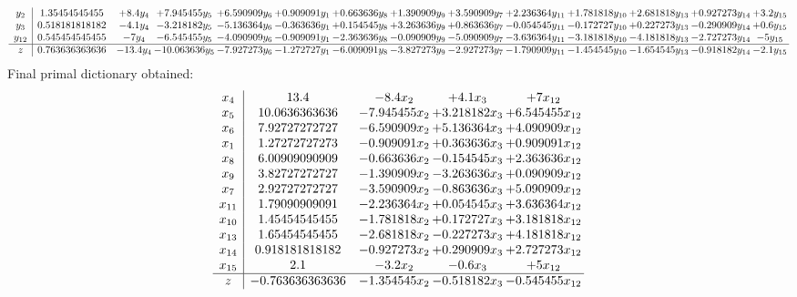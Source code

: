 \documentclass[11pt]{article}
\begin{document}
\[\begin{array}{c| c c@{\hskip 2pt} c@{\hskip 2pt} c@{\hskip 2pt} c@{\hskip 2pt} c@{\hskip 2pt} c@{\hskip 2pt} c@{\hskip 2pt} c@{\hskip 2pt} c@{\hskip 2pt} c@{\hskip 2pt} c@{\hskip 2pt} c@{\hskip 2pt} }
 y_{2}   &  1.35454545455 & + 8.4 y_{4} & + 7.945455 y_{5} & + 6.590909 y_{6} & + 0.909091 y_{1} & + 0.663636 y_{8} & + 1.390909 y_{9} & + 3.590909 y_{7} & + 2.236364 y_{11} & + 1.781818 y_{10} & + 2.681818 y_{13} & + 0.927273 y_{14} & + 3.2 y_{15}\\
 y_{3}   &  0.518181818182 & -4.1 y_{4} & -3.218182 y_{5} & -5.136364 y_{6} & -0.363636 y_{1} & + 0.154545 y_{8} & + 3.263636 y_{9} & + 0.863636 y_{7} & -0.054545 y_{11} & -0.172727 y_{10} & + 0.227273 y_{13} & -0.290909 y_{14} & + 0.6 y_{15}\\
 y_{12}   &  0.545454545455 & -7 y_{4} & -6.545455 y_{5} & -4.090909 y_{6} & -0.909091 y_{1} & -2.363636 y_{8} & -0.090909 y_{9} & -5.090909 y_{7} & -3.636364 y_{11} & -3.181818 y_{10} & -4.181818 y_{13} & -2.727273 y_{14} & -5 y_{15}\\
\hline
z    &  0.763636363636 & -13.4 y_{4} & -10.063636 y_{5} & -7.927273 y_{6} & -1.272727 y_{1} & -6.009091 y_{8} & -3.827273 y_{9} & -2.927273 y_{7} & -1.790909 y_{11} & -1.454545 y_{10} & -1.654545 y_{13} & -0.918182 y_{14} & -2.1 y_{15}\\
\end{array}\]
 Final primal dictionary obtained: 
\[\begin{array}{c| c c@{\hskip 2pt} c@{\hskip 2pt} c@{\hskip 2pt} }
 x_{4}   &  13.4 & -8.4 x_{2} & + 4.1 x_{3} & + 7 x_{12}\\
 x_{5}   &  10.0636363636 & -7.945455 x_{2} & + 3.218182 x_{3} & + 6.545455 x_{12}\\
 x_{6}   &  7.92727272727 & -6.590909 x_{2} & + 5.136364 x_{3} & + 4.090909 x_{12}\\
 x_{1}   &  1.27272727273 & -0.909091 x_{2} & + 0.363636 x_{3} & + 0.909091 x_{12}\\
 x_{8}   &  6.00909090909 & -0.663636 x_{2} & -0.154545 x_{3} & + 2.363636 x_{12}\\
 x_{9}   &  3.82727272727 & -1.390909 x_{2} & -3.263636 x_{3} & + 0.090909 x_{12}\\
 x_{7}   &  2.92727272727 & -3.590909 x_{2} & -0.863636 x_{3} & + 5.090909 x_{12}\\
 x_{11}   &  1.79090909091 & -2.236364 x_{2} & + 0.054545 x_{3} & + 3.636364 x_{12}\\
 x_{10}   &  1.45454545455 & -1.781818 x_{2} & + 0.172727 x_{3} & + 3.181818 x_{12}\\
 x_{13}   &  1.65454545455 & -2.681818 x_{2} & -0.227273 x_{3} & + 4.181818 x_{12}\\
 x_{14}   &  0.918181818182 & -0.927273 x_{2} & + 0.290909 x_{3} & + 2.727273 x_{12}\\
 x_{15}   &  2.1 & -3.2 x_{2} & -0.6 x_{3} & + 5 x_{12}\\
\hline
z    &  -0.763636363636 & -1.354545 x_{2} & -0.518182 x_{3} & -0.545455 x_{12}\\
\end{array}\]
\end{document}
